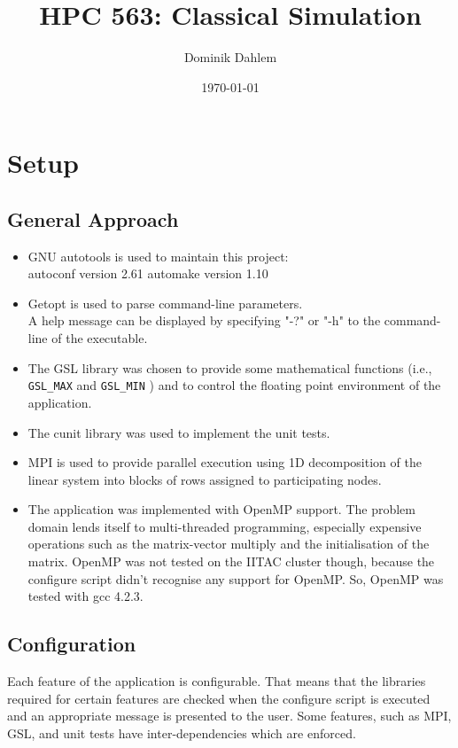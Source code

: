 \documentclass[12pt,a4paper]{report}
\author{Dominik Dahlem}
\title{HPC 563: Classical Simulation}
\date{\today}
\def\ccode#1{
  \lstinline[basicstyle=\ttfamily,language=C]{#1} }
\begin{document}
\maketitle

\chapter{Setup}
\label{cha:setup}

\section{General Approach}
\label{sec:general-approach}
\begin{itemize}
\item GNU autotools is used to maintain this project:\\
  autoconf version 2.61 automake version 1.10
\item Getopt is used to parse command-line parameters.\\
  A help message can be displayed by specifying "-?" or "-h" to the
  command-line of the executable.
\item The GSL library was chosen to provide some mathematical
  functions (i.e., \ccode{GSL_MAX} and \ccode{GSL_MIN}) and to control
  the floating point environment of the application.
\item The cunit library was used to implement the unit tests.
\item MPI is used to provide parallel execution using 1D decomposition
  of the linear system into blocks of rows assigned to participating
  nodes.
\item The application was implemented with OpenMP support. The problem
  domain lends itself to multi-threaded programming, especially
  expensive operations such as the matrix-vector multiply and the
  initialisation of the matrix. OpenMP was not tested on the IITAC
  cluster though, because the configure script didn't recognise any
  support for OpenMP. So, OpenMP was tested with gcc 4.2.3.
\end{itemize}

\section{Configuration}
\label{sec:configuration}
Each feature of the application is configurable. That means that the
libraries required for certain features are checked when the configure
script is executed and an appropriate message is presented to the
user. Some features, such as MPI, GSL, and unit tests have
inter-dependencies which are enforced.
\end{document}

